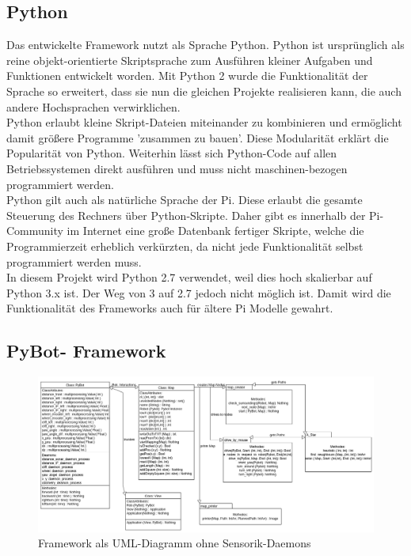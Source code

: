 \documentclass[twoside,12pt,a4paper]{report}
\begin{document}
	\subsection{Python}
	Das entwickelte Framework nutzt als Sprache Python. Python ist ursprünglich als reine objekt-orientierte Skriptsprache zum Ausführen kleiner Aufgaben und Funktionen entwickelt worden. Mit Python 2 wurde die Funktionalität der Sprache so erweitert, dass sie nun die gleichen Projekte realisieren kann, die auch andere Hochsprachen verwirklichen. \\
	Python erlaubt kleine Skript-Dateien miteinander zu kombinieren und ermöglicht damit größere Programme 'zusammen zu bauen'. Diese Modularität erklärt die Popularität von Python. Weiterhin lässt sich Python-Code auf allen Betriebssystemen direkt ausführen und muss nicht maschinen-bezogen programmiert werden. \\
	Python gilt auch als natürliche Sprache der Pi. Diese erlaubt die gesamte Steuerung des Rechners über Python-Skripte. Daher gibt es innerhalb der Pi-Community im Internet eine große Datenbank fertiger Skripte, welche die Programmierzeit erheblich verkürzten, da nicht  jede Funktionalität selbst programmiert werden muss. \\
	In diesem Projekt wird Python 2.7 verwendet, weil dies hoch skalierbar auf Python 3.x ist. Der Weg von 3 auf 2.7 jedoch nicht möglich ist. Damit wird die Funktionalität des Frameworks auch für ältere Pi Modelle gewahrt.
	
	
	\subsection{PyBot- Framework}
	
	\begin{figure}[!htb]
		\centering
		\includegraphics[scale=0.50, angle=90]{images/software.png}
		\caption{Framework als UML-Diagramm ohne Sensorik-Daemons}
	\end{figure}
	
\end{document}

